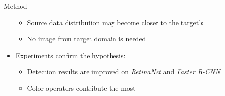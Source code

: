 \documentclass[aspectratio=141]{beamer}
\begin{document}
\begin{frame}{Method}
\begin{overlayarea}{\textwidth}{12cm}
\begin{itemize}
\begin{itemize}
            \item Source data distribution may become closer to the target's
            \item No image from target domain is needed
        \end{itemize}
        \vspace*{5mm}
        \item<3-> Experiments confirm the hypothesis:
        \begin{itemize}
            \item Detection results are improved on \textit{RetinaNet} and \textit{Faster R-CNN}
            \item Color operators contribute the most
        \end{itemize}
    \end{itemize}
    \end{overlayarea}
\end{frame}
\end{document}
